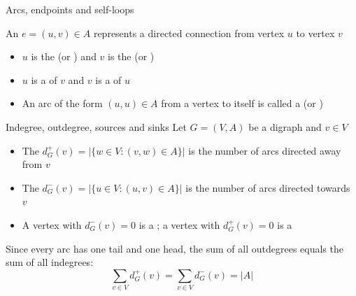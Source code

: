 \documentclass[aspectratio=169]{beamer}\usepackage[]{graphicx}\usepackage[]{xcolor}
\begin{document}
\begin{frame}{Arcs, endpoints and self-loops}
\begin{definition}
An  $e = (u, v) \in A$ represents a directed connection from vertex $u$ to vertex $v$
\begin{itemize}
\item $u$ is the  (or ) and $v$ is the  (or )
\item $u$ is a  of $v$ and $v$ is a  of $u$
\item An arc of the form $(u, u) \in A$ from a vertex to itself is called a  (or )
\end{itemize}
\end{definition}
\vfill
\begin{center}
\end{center}
\end{frame}

\begin{frame}{Indegree, outdegree, sources and sinks}
Let $G = (V, A)$ be a digraph and $v \in V$
\begin{importantdefinition}
\begin{itemize}
\item The  $d_G^+(v) = |\{w \in V : (v, w) \in A\}|$ is the number of arcs directed away from $v$
\item The  $d_G^-(v) = |\{u \in V : (u, v) \in A\}|$ is the number of arcs directed towards $v$
\item A vertex with $d_G^-(v) = 0$ is a ; a vertex with $d_G^+(v) = 0$ is a 
\end{itemize}
\end{importantdefinition}
\vfill
Since every arc has one tail and one head, the sum of all outdegrees equals the sum of all indegrees:
\[
\sum_{v \in V} d_G^+(v) = \sum_{v \in V} d_G^-(v) = |A|
\]
\end{frame}
\end{document}
